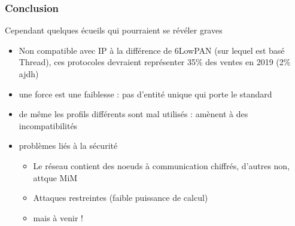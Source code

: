 \documentclass{beamer}
\begin{document}
  \begin{frame}
    \frametitle{Conclusion}
    \begin{block}{Cependant quelques écueils qui pourraient se révéler graves}
      \begin {itemize}
	\item Non compatible avec IP à la différence de 6LowPAN (sur lequel est basé Thread), ces protocoles devraient représenter 35\% des ventes en 2019 (2\% ajdh)
	\item une force est une faiblesse : pas d'entité unique qui porte le standard 
	\item de même les profils différents sont mal utilisés : amènent à des incompatibilités
	\item problèmes liés à la sécurité
	\begin{itemize}
	  \item Le réseau contient des noeuds à communication chiffrés, d'autres non, attque MiM
	  \item Attaques restreintes (faible puissance de calcul)
	  \item mais à venir !
	\end{itemize}
      \end{itemize}
    \end{block}
  \end{frame}  
\end{document}
